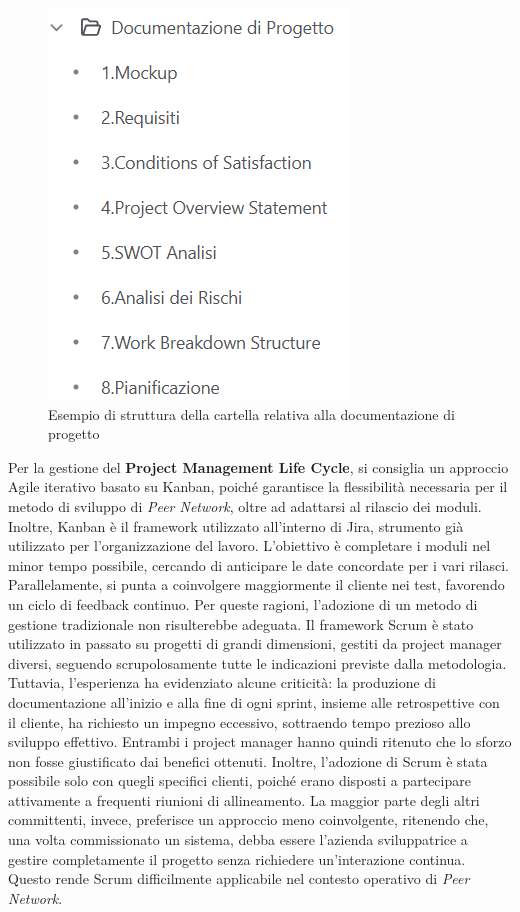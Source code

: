 \begin{figure}
    \centering
    \includegraphics[scale=0.6]{figures/strutturaConfluenceProposta.png}
    \caption{Esempio di struttura della cartella relativa alla documentazione di progetto}
    \label{fig:doc-progetto}
\end{figure}

Per la gestione del \textbf{Project Management Life Cycle}, si consiglia un approccio Agile iterativo basato su Kanban, poiché garantisce
la flessibilità necessaria per il metodo di sviluppo di \textit{Peer Network}, oltre ad adattarsi al rilascio dei moduli.
Inoltre, Kanban è il framework utilizzato all’interno di Jira, strumento già utilizzato per l’organizzazione del lavoro. L’obiettivo è
completare i moduli nel minor tempo possibile, cercando di anticipare le date concordate per i vari rilasci. Parallelamente, si
punta a coinvolgere maggiormente il cliente nei test, favorendo un ciclo di feedback continuo. Per queste ragioni,
l’adozione di un metodo di gestione tradizionale non risulterebbe adeguata. Il framework Scrum è stato utilizzato in passato su progetti di
grandi dimensioni, gestiti da project manager diversi, seguendo scrupolosamente tutte le indicazioni previste dalla metodologia.
Tuttavia, l’esperienza ha evidenziato alcune criticità: la produzione di documentazione all’inizio e alla fine di ogni sprint,
insieme alle retrospettive con il cliente, ha richiesto un impegno eccessivo, sottraendo tempo prezioso allo sviluppo effettivo.
Entrambi i project manager hanno quindi ritenuto che lo sforzo non fosse giustificato dai benefici ottenuti. Inoltre, l’adozione
di Scrum è stata possibile solo con quegli specifici clienti, poiché erano disposti a partecipare attivamente a frequenti riunioni di
allineamento. La maggior parte degli altri committenti, invece, preferisce un approccio meno coinvolgente, ritenendo che, una volta
commissionato un sistema, debba essere l’azienda sviluppatrice a gestire completamente il progetto senza richiedere un’interazione
continua. Questo rende Scrum difficilmente applicabile nel contesto operativo di \textit{Peer Network}.


